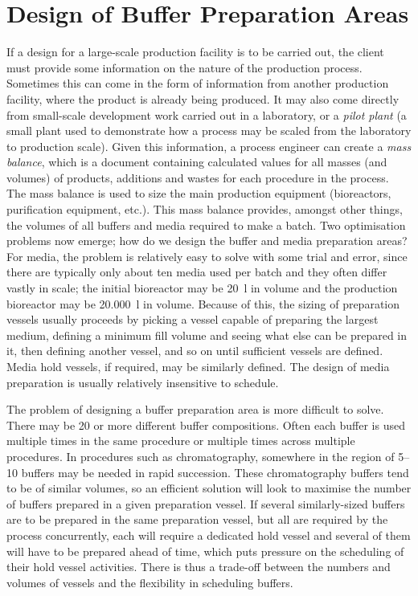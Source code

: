 \section{Design of Buffer Preparation Areas}\label{SS.buffprepdes}

If a design for a large-scale production facility is to be carried out, the
client must provide some information on the nature of the production process.
Sometimes this can come in the form of information from another production
facility, where the product is already being produced. 
It may also come directly from small-scale development work carried out in a
laboratory, or a \emph{pilot plant} (a small plant used to demonstrate how a
process may be scaled from the laboratory to production scale).
Given this information, a process engineer can create a \emph{mass balance}, 
which is a document containing calculated values for all masses (and volumes)
of products, additions and wastes for each procedure in the process.
The mass balance is used to size the main production equipment (bioreactors,
purification equipment, etc.).
This mass balance provides, amongst other things, the volumes of all buffers
and media required to make a batch.
Two optimisation problems now emerge; how do we design the buffer and media
preparation areas?
For media, the problem is relatively easy to solve with some trial and error,
since there are typically only about ten media used per batch and they often
differ vastly in scale; the initial bioreactor may be \SI{20}{\litre} in volume
and the production bioreactor may be \SI{20,000}{\litre} in volume.
Because of this, the sizing of preparation vessels usually proceeds by picking
a vessel capable of preparing the largest medium, defining a minimum fill
volume and seeing what else can be prepared in it, then defining another
vessel, and so on until sufficient vessels are defined.
Media hold vessels, if required, may be similarly defined.
The design of media preparation is usually relatively insensitive to schedule.

The problem of designing a buffer preparation area is more difficult to solve.
There may be 20 or more different buffer compositions.
Often each buffer is used multiple times in the same procedure or multiple
times across multiple procedures.
In procedures such as chromatography, somewhere in the region of 
\numrange[range-phrase=--]{5}{10} buffers may be needed in rapid succession.
These chromatography buffers tend to be of similar volumes, so an efficient
solution will look to maximise the number of buffers prepared in a given
preparation vessel.
If several similarly-sized buffers are to be prepared in the same preparation
vessel, but all are required by the process concurrently, each will require a
dedicated hold vessel and several of them will have to be prepared ahead of
time, which puts pressure on the scheduling of their hold vessel activities.
There is thus a trade-off between the numbers and volumes of vessels and
the flexibility in scheduling buffers.

